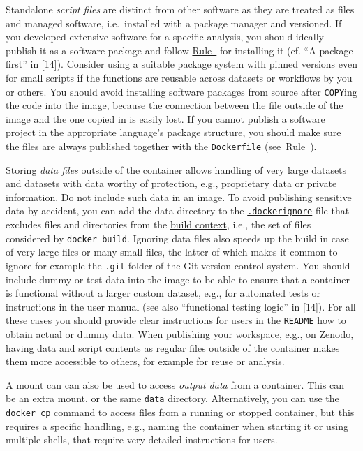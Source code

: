 \documentclass[10pt,letterpaper]{article}
\begin{document}
Standalone \emph{script files} are distinct from other software as they
are treated as files and managed software, i.e.~installed with a package
manager and versioned. If you developed extensive software for a
specific analysis, you should ideally publish it as a software package
and follow \hyperref[{rule:pinning}]{Rule~} for
installing it (cf. ``A package first'' in {[}14{]}). Consider using a
suitable package system with pinned versions even for small scripts if
the functions are reusable across datasets or workflows by you or
others. You should avoid installing software packages from source after
\texttt{COPY}ing the code into the image, because the connection between
the file outside of the image and the one copied in is easily lost. If
you cannot publish a software project in the appropriate language's
package structure, you should make sure the files are always published
together with the \texttt{Dockerfile}
(see~\hyperref[{rule:publish}]{Rule~}).

Storing \emph{data files} outside of the container allows handling of
very large datasets and datasets with data worthy of protection, e.g.,
proprietary data or private information. Do not include such data in an
image. To avoid publishing sensitive data by accident, you can add the
data directory to the
\href{https://docs.docker.com/engine/reference/commandline/build/\#use-a-dockerignore-file}{\texttt{.dockerignore}}
file that excludes files and directories from the
\href{https://docs.docker.com/engine/reference/commandline/build/\#extended-description}{build
context}, i.e., the set of files considered by \texttt{docker\ build}.
Ignoring data files also speeds up the build in case of very large files
or many small files, the latter of which makes it common to ignore for
example the \texttt{.git} folder of the Git version control system. You
should include dummy or test data into the image to be able to ensure
that a container is functional without a larger custom dataset, e.g.,
for automated tests or instructions in the user manual (see also
``functional testing logic'' in {[}14{]}). For all these cases you
should provide clear instructions for users in the \texttt{README} how
to obtain actual or dummy data. When publishing your workspace, e.g., on
Zenodo, having data and script contents as regular files outside of the
container makes them more accessible to others, for example for reuse or
analysis.

A mount can can also be used to access \emph{output data} from a
container. This can be an extra mount, or the same \texttt{data}
directory. Alternatively, you can use the
\href{https://docs.docker.com/engine/reference/commandline/cp/}{\texttt{docker\ cp}}
command to access files from a running or stopped container, but this
requires a specific handling, e.g., naming the container when starting
it or using multiple shells, that require very detailed instructions for
users.
\end{document}

